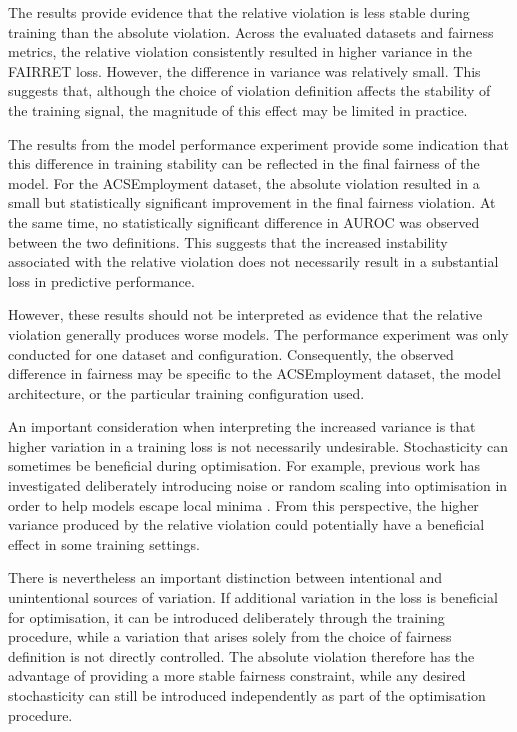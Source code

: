 The results provide evidence that the relative violation is less stable during training than the absolute violation. Across the evaluated datasets and fairness metrics, the relative violation consistently resulted in higher variance in the FAIRRET loss. However, the difference in variance was relatively small. This suggests that, although the choice of violation definition affects the stability of the training signal, the magnitude of this effect may be limited in practice.

The results from the model performance experiment provide some indication that this difference in training stability can be reflected in the final fairness of the model. For the ACSEmployment dataset, the absolute violation resulted in a small but statistically significant improvement in the final fairness violation. At the same time, no statistically significant difference in AUROC was observed between the two definitions. This suggests that the increased instability associated with the relative violation does not necessarily result in a substantial loss in predictive performance.

However, these results should not be interpreted as evidence that the relative violation generally produces worse models. The performance experiment was only conducted for one dataset and configuration. Consequently, the observed difference in fairness may be specific to the ACSEmployment dataset, the model architecture, or the particular training configuration used.

An important consideration when interpreting the increased variance is that higher variation in a training loss is not necessarily undesirable. Stochasticity can sometimes be beneficial during optimisation. For example, previous work has investigated deliberately introducing noise or random scaling into optimisation in order to help models escape local minima . From this perspective, the higher variance produced by the relative violation could potentially have a beneficial effect in some training settings.

There is nevertheless an important distinction between intentional and unintentional sources of variation. If additional variation in the loss is beneficial for optimisation, it can be introduced deliberately through the training procedure, while a variation that arises solely from the choice of fairness definition is not directly controlled. The absolute violation therefore has the advantage of providing a more stable fairness constraint, while any desired stochasticity can still be introduced independently as part of the optimisation procedure.

